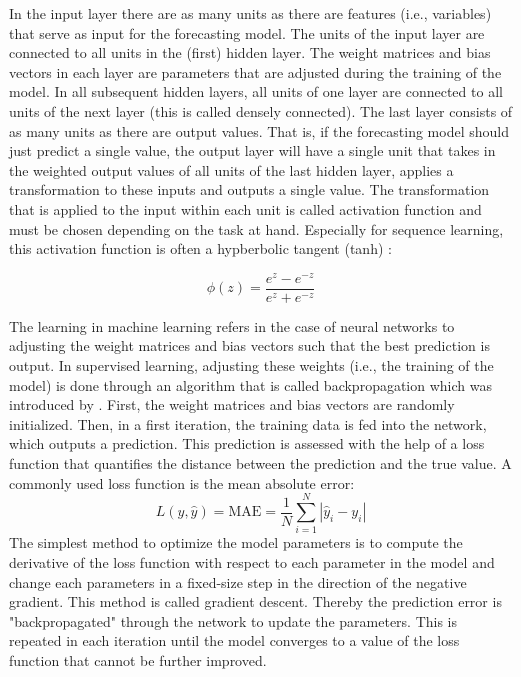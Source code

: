 In the input layer there are as many units as there are features (i.e., variables) that serve as input for the forecasting model. The units of the input layer are connected to all units in the (first) hidden layer. The weight matrices and bias vectors in each layer are parameters that are adjusted during the training of the model. In all subsequent hidden layers, all units of one layer are connected to all units of the next layer (this is called densely connected). The last layer consists of as many units as there are output values. That is, if the forecasting model should just predict a single value, the output layer will have a single unit that takes in the weighted output values of all units of the last hidden layer, applies a transformation to these inputs and outputs a single value. The transformation that is applied to the input within each unit is called activation function and must be chosen depending on the task at hand. Especially for sequence learning, this activation function is often a hypberbolic tangent (tanh) \citep{Lipton:2015}:

\begin{equation} \label{activation}
    \phi(z)=\frac{e^z-e^{-z}}{e^z+e^{-z}}
\end{equation}

The learning in machine learning refers in the case of neural networks to adjusting the weight matrices and bias vectors such that the best prediction is output. In supervised learning, adjusting these weights (i.e., the training of the model) is done through an algorithm that is called backpropagation which was introduced by \citet{Rumelhart:1986}. First, the weight matrices and bias vectors are randomly initialized. Then, in a first iteration, the training data is fed into the network, which outputs a prediction. This prediction is assessed with the help of a loss function that quantifies the distance between the prediction and the true value. A commonly used loss function is the mean absolute error:
%
\begin{equation} \label{lossMAE}
    L\left(y, \widehat{y}\right)=\text{MAE}=\frac{1}{N}\sum_{i=1}^N\left|\widehat{y}_i-y_i\right|
\end{equation}
%
The simplest method to optimize the model parameters is to compute the derivative of the loss function with respect to each parameter in the model and change each parameters in a fixed-size step in the direction of the negative gradient. This method is called gradient descent. Thereby the prediction error is "backpropagated" through the network to update the parameters. This is repeated in each iteration until the model converges to a value of the loss function that cannot be further improved.



